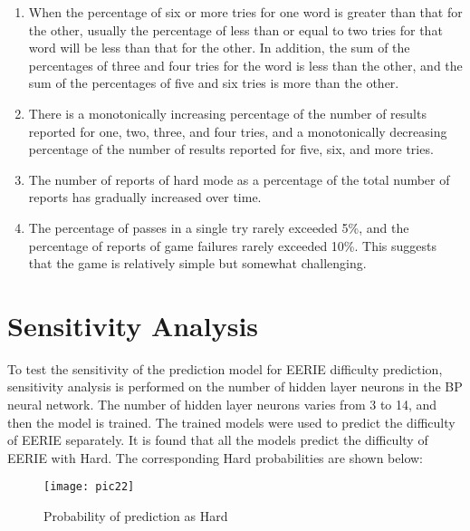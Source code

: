 \documentclass[12pt]{article}  %
\begin{document}
\begin{enumerate}[\bfseries 1.]
	\setlength{\parsep}{0ex} %
	\setlength{\topsep}{0.5pt} %
	\setlength{\itemsep}{0.5pt} %
	\item When the percentage of six or more tries for one word is greater than that for the other, usually the percentage of less than or equal to two tries for that word will be less than that for the other. In addition, the sum of the percentages of three and four tries for the word is less than the other, and the sum of the percentages of five and six tries is more than the other.
	
	\item There is a monotonically increasing percentage of the number of results reported for one, two, three, and four tries, and a monotonically decreasing percentage of the number of results reported for five, six, and more tries.
	
	\item The number of reports of hard mode as a percentage of the total number of reports has gradually increased over time.
	
	\item The percentage of passes in a single try rarely exceeded 5\%, and the percentage of reports of game failures rarely exceeded 10\%. This suggests that the game is relatively simple but somewhat challenging.
\end{enumerate}

\section{Sensitivity Analysis}
To test the sensitivity of the prediction model for EERIE difficulty prediction, sensitivity analysis is performed on the number of hidden layer neurons in the BP neural network. The number of hidden layer neurons varies from 3 to 14, and then the model is trained. The trained models were used to predict the difficulty of EERIE separately. It is found that all the models predict the difficulty of EERIE with Hard. The corresponding Hard probabilities are shown below:

\begin{figure}[H]  %
	\centering  %
	\texttt{[image: pic22]} %
	\caption{Probability of prediction as Hard}  
	\label{pic22}
\end{figure}
\vspace{-0.5cm}
\end{document}
